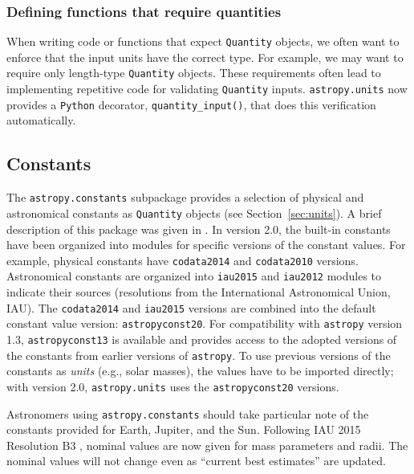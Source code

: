 \documentclass[modern]{aastex61}
\newcommand{\package}[1]{\texttt{#1}\xspace}
\newcommand{\python}{\package{Python}}
\newcommand{\astropypkg}{\package{astropy}}
\newcommand{\sectionname}{Section\xspace}
\begin{document}
\subsubsection{Defining functions that require quantities}
        When writing code or
        functions that expect \texttt{Quantity} objects, we often want to
        enforce that the input units have the correct type.
        For example, we may want to require only length-type \texttt{Quantity}
        objects.
        These requirements often lead to implementing repetitive code for
        validating \texttt{Quantity} inputs.
        \texttt{astropy.units} now provides a \python decorator,
        \texttt{quantity\_input()}, that does this verification automatically.


\subsection{Constants}

The \texttt{astropy.constants} subpackage provides a selection of physical and
astronomical constants as \texttt{Quantity} objects (see
\sectionname~\ref{sec:units}).
A brief description of this package was given in \citep{astropy}.
In version 2.0, the built-in constants have been organized into modules for
specific versions of the constant values.
For example, physical constants have \texttt{codata2014} \citep{codata2014} and
\texttt{codata2010} versions.
Astronomical constants are organized into \texttt{iau2015} and \texttt{iau2012}
modules to indicate their sources (resolutions from the International
Astronomical Union, IAU).
The \texttt{codata2014} and \texttt{iau2015} versions are combined into the
default constant value version: \texttt{astropyconst20}.
For compatibility with \astropypkg version 1.3,  \texttt{astropyconst13}
is available and provides access to the adopted versions of the
constants from earlier versions of \astropypkg.
To use previous versions of the constants as \emph{units} (e.g., solar masses),
the values have to be imported directly; with version
2.0, \texttt{astropy.units} uses the \texttt{astropyconst20} versions.

Astronomers using \texttt{astropy.constants} should take particular note of the
constants provided for Earth, Jupiter, and the Sun.
Following IAU 2015 Resolution B3 \citep{iau2015b3}, nominal values are now given
for mass parameters and radii.
The nominal values will not change even as ``current best estimates'' are
updated.
\end{document}
